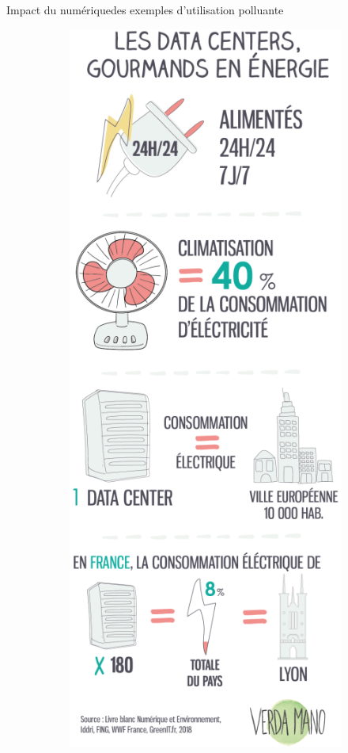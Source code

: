 \documentclass[10pt,xcolor={dvipsnames}]{beamer}
\begin{document}
\begin{frame}{Impact du numérique}{des exemples d'utilisation polluante}
\begin{figure}[h!]
\begin{minipage}[b]{0.3\linewidth}
\begin{figure}
    \includegraphics[scale=0.17]{Feathergraphics/datacenter.png}
\end{figure}
\end{minipage}\hfill


\end{figure}


\end{frame}
\end{document}
